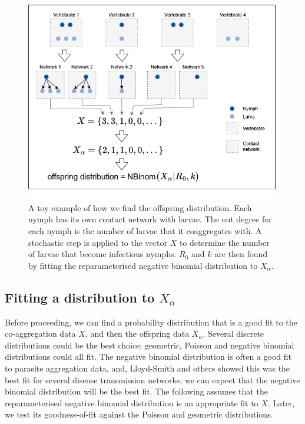 \documentclass{article}
\begin{document}
\begin{figure}[h!]
    \includegraphics[width=1\textwidth, center]{coaggregation_data_diagram_mk3.drawio.png}
    \caption{A toy example of how we find the offspring distribution. Each nymph has its own contact network with larvae. The out degree for each nymph is the number of larvae that it coaggregates with. A stochastic step is applied to the vector $ X $ to determine the number of larvae that become infectious nymphs. $ R_0 $ and $ k $ are then found by fitting the reparameterised negative binomial distribution to $ X_\alpha $.}\label{fig:coaggregation_diagram}
\end{figure}

\subsection{Fitting a distribution to \texorpdfstring{$ X_\alpha $}{X\_alpha}}

Before proceeding, we can find a probability distribution that is a good fit to the co-aggregation data $ X $, and then the offspring data $ X_\alpha $. Several discrete distributions could be the best choice: geometric, Poisson and negative binomial distributions could all fit. The negative binomial distribution is often a good fit to parasite aggregation data, and, Lloyd-Smith and others showed this was the best fit for several disease transmission networks; we can expect that the negative binomial distribution will be the best fit. The following assumes that the reparameterised negative binomial distribution is an appropriate fit to $ X $. Later, we test its goodness-of-fit against the Poisson and geometric distributions.
\end{document}
